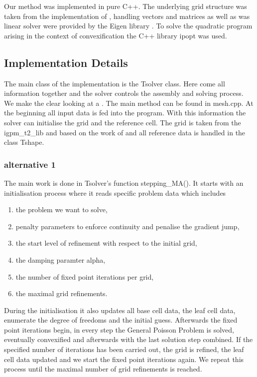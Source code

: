 Our method was implemented in pure C++. The underlying grid structure was taken from the implementation of \cite{BMV2009}, handling vectors and matrices as well as was linear solver were provided by the Eigen library \cite{eigenweb}. To solve the quadratic program arising in the context of convexification the C++ library ipopt \cite{ipopt} was used.


\subsection{Implementation Details}

The main class of the implementation is the Tsolver class. Here come all information together and the solver controls the assembly and solving process. 
We make the clear looking at a . The main method can be found in mesh.cpp. At the beginning all input data is fed into the program. With this information the solver can initialise the grid and the reference cell. 
The grid is taken from the igpm\_t2\_lib and based on the work of \cite{BMV2009} and all reference data is handled in the class Tshape.

\subsubsection{alternative 1}
The main work is done in Tsolver's function stepping\_MA(). It starts with an initialisation process where it reads specific problem data which includes
\begin{enumerate}
 \item  the problem we want to solve,
 \item penalty parameters to enforce continuity and penalise the gradient jump,
 \item the start level of refinement with respect to the initial grid,
 \item the damping paramter alpha,
 \item the number of fixed point iterations per grid,
 \item the maximal grid refinements.
\end{enumerate}
During the initialisation it also updates all base cell data, the leaf cell data, enumerate the degree of freedoms and the initial guess.
Afterwards the fixed point iterations begin, in every step the General Poisson Problem is solved, eventually convexified and afterwards with the last solution step combined. If the specified number of iterations has been carried out, the grid is refined, the leaf cell data updated and we start the fixed point iterations again.
We repeat this process until the maximal number of grid refinements is reached.


